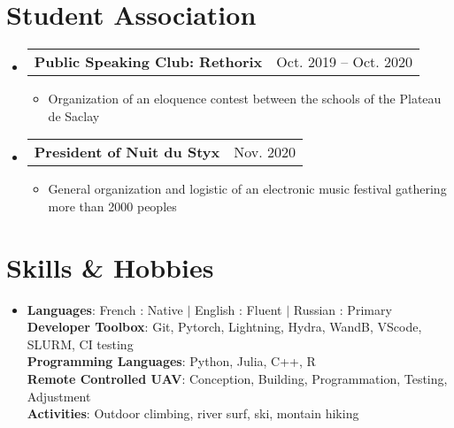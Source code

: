 \documentclass[letterpaper,11pt]{article}
\makeatletter
\newcommand{\resumeItem}[1]{
  \item\small{
    {#1 \vspace{-2pt}}
  }
}
\newcommand{\resumeProjectHeading}[2]{
    \item
    \begin{tabular*}{0.97\textwidth}{l@{\extracolsep{\fill}}r}
      \small#1 & #2 \\
    \end{tabular*}\vspace{-7pt}
}
\newcommand{\resumeSubHeadingListStart}{\begin{itemize}[leftmargin=0.15in, label={}]}
\newcommand{\resumeSubHeadingListEnd}{\end{itemize}}
\newcommand{\resumeItemListStart}{\begin{itemize}}
\newcommand{\resumeItemListEnd}{\end{itemize}\vspace{-5pt}}
\makeatother
\begin{document}
\section{Student Association}
 \resumeSubHeadingListStart
      \resumeProjectHeading
          {\textbf{Public Speaking Club: Rethorix} }{Oct. 2019 -- Oct. 2020}
          \resumeItemListStart
            \resumeItem{Organization of an eloquence contest between the schools of the Plateau de Saclay}

          \resumeItemListEnd
               \resumeProjectHeading
          {\textbf{President of Nuit du Styx} }{Nov. 2020}
          \resumeItemListStart
            \resumeItem{General organization and logistic of an electronic music festival gathering more than 2000 peoples}

          \resumeItemListEnd
    \resumeSubHeadingListEnd
\section{Skills \& Hobbies}
 \begin{itemize}[leftmargin=0.15in, label={}]
    \item{
    \textbf{Languages}{: French : Native $|$ English : Fluent $|$ Russian : Primary }} \\
     \textbf{Developer Toolbox}{: Git, Pytorch, Lightning, Hydra, WandB, VScode, SLURM, CI testing} \\
     \textbf{Programming Languages}{: Python, Julia, C++, R} \\
    \vspace{10pt}
    \textbf{Remote Controlled UAV}{: Conception, Building, Programmation, Testing, Adjustment } \\
     \textbf{Activities}{: Outdoor climbing, river surf, ski, montain hiking }
 \end{itemize}
\end{document}
